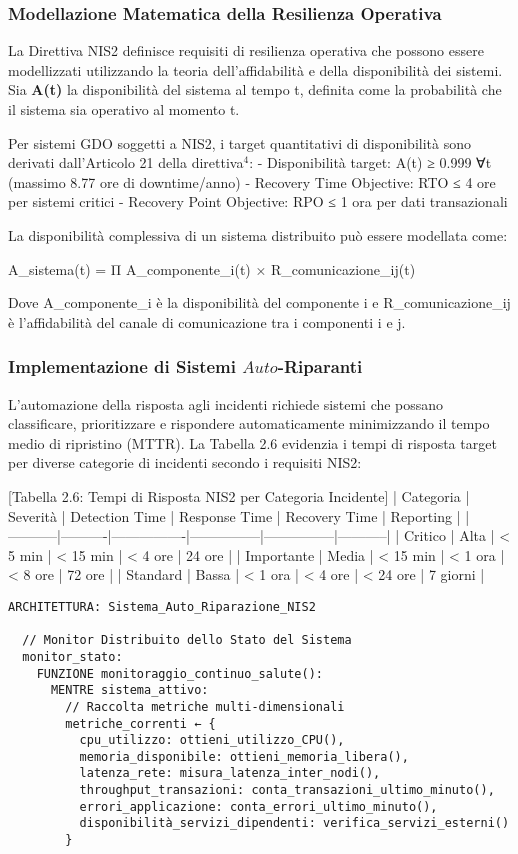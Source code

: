 {\subsubsection{Modellazione Matematica della Resilienza Operativa}

La Direttiva NIS2 definisce requisiti di resilienza operativa che possono essere modellizzati utilizzando la teoria dell'affidabilità e della disponibilità dei sistemi. Sia \textbf{A(t)} la disponibilità del sistema al tempo t, definita come la probabilità che il sistema sia operativo al momento t.

Per sistemi GDO soggetti a NIS2, i target quantitativi di disponibilità sono derivati dall'Articolo 21 della direttiva$^{4}$:
- Disponibilità target: A(t) ≥ 0.999 ∀t (massimo 8.77 ore di downtime/anno)
- Recovery Time Objective: RTO ≤ 4 ore per sistemi critici
- Recovery Point Objective: RPO ≤ 1 ora per dati transazionali

La disponibilità complessiva di un sistema distribuito può essere modellata come:

A_sistema(t) = Π A_componente_i(t) × R_comunicazione_ij(t)

Dove A_componente_i è la disponibilità del componente i e R_comunicazione_ij è l'affidabilità del canale di comunicazione tra i componenti i e j.

\subsubsection{Implementazione di Sistemi $Auto$-Riparanti}

L'automazione della risposta agli incidenti richiede sistemi che possano classificare, prioritizzare e rispondere automaticamente minimizzando il tempo medio di ripristino (MTTR). La Tabella 2.6 evidenzia i tempi di risposta target per diverse categorie di incidenti secondo i requisiti NIS2:

[Tabella 2.6: Tempi di Risposta NIS2 per Categoria Incidente]
| Categoria | Severità | Detection Time | Response Time | Recovery Time | Reporting |
|-----------|----------|----------------|---------------|---------------|-----------|
| Critico | Alta | < 5 min | < 15 min | < 4 ore | 24 ore |
| Importante | Media | < 15 min | < 1 ora | < 8 ore | 72 ore |
| Standard | Bassa | < 1 ora | < 4 ore | < 24 ore | 7 giorni |

\begin{verbatim}
ARCHITETTURA: Sistema_Auto_Riparazione_NIS2

  // Monitor Distribuito dello Stato del Sistema
  monitor_stato:
    FUNZIONE monitoraggio_continuo_salute():
      MENTRE sistema_attivo:
        // Raccolta metriche multi-dimensionali
        metriche_correnti ← {
          cpu_utilizzo: ottieni_utilizzo_CPU(),
          memoria_disponibile: ottieni_memoria_libera(),
          latenza_rete: misura_latenza_inter_nodi(),
          throughput_transazioni: conta_transazioni_ultimo_minuto(),
          errori_applicazione: conta_errori_ultimo_minuto(),
          disponibilità_servizi_dipendenti: verifica_servizi_esterni()
        }
        

\end{verbatim}}
